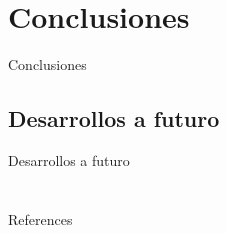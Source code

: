 \documentclass[spanish,a4paper]{beamer}%
\makeatletter
\def\beamer@writeslidentry@miniframesoff{%
  \expandafter\beamer@ifempty\expandafter{\beamer@framestartpage}{}%
  {%
    \clearpage\beamer@notesactions%
  }
}
\newcommand*{\miniframesoff}{\let\beamer@writeslidentry=\beamer@writeslidentry@miniframesoff}
\makeatother
\begin{document}
	\section{Conclusiones}
	\begin{frame}{Conclusiones}
	\end{frame}
	\subsection*{Desarrollos a futuro}
	\begin{frame}{Desarrollos a futuro}
		
	\end{frame}
	\miniframesoff
	\section{}
	\begin{frame}{References}
        
				\tiny
        
				
\end{frame}
\end{document}
